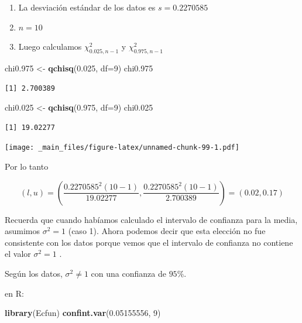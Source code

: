 \documentclass[
]{book}
\newenvironment{Shaded}{\begin{snugshade}}{\end{snugshade}}
\newcommand{\AttributeTok}[1]{\textcolor[rgb]{0.13,0.29,0.53}{#1}}
\newcommand{\DecValTok}[1]{\textcolor[rgb]{0.00,0.00,0.81}{#1}}
\newcommand{\FloatTok}[1]{\textcolor[rgb]{0.00,0.00,0.81}{#1}}
\newcommand{\FunctionTok}[1]{\textcolor[rgb]{0.13,0.29,0.53}{\textbf{#1}}}
\newcommand{\NormalTok}[1]{#1}
\newcommand{\OtherTok}[1]{\textcolor[rgb]{0.56,0.35,0.01}{#1}}
\begin{document}
\begin{enumerate}
\def\labelenumi{\arabic{enumi}.}
\item
  La desviación estándar de los datos es \(s=0.2270585\)
\item
  \(n=10\)
\item
  Luego calculamos \(\chi^2_{0.025,n-1}\) y \(\chi^2_{0.975,n-1}\)
\end{enumerate}

\begin{Shaded}
\begin{Highlighting}[]
\NormalTok{chi0}\FloatTok{.975} \OtherTok{\textless{}{-}} \FunctionTok{qchisq}\NormalTok{(}\FloatTok{0.025}\NormalTok{, }\AttributeTok{df=}\DecValTok{9}\NormalTok{)}
\NormalTok{chi0}\FloatTok{.975}
\end{Highlighting}
\end{Shaded}

\begin{verbatim}
[1] 2.700389
\end{verbatim}

\begin{Shaded}
\begin{Highlighting}[]
\NormalTok{chi0}\FloatTok{.025} \OtherTok{\textless{}{-}} \FunctionTok{qchisq}\NormalTok{(}\FloatTok{0.975}\NormalTok{, }\AttributeTok{df=}\DecValTok{9}\NormalTok{)}
\NormalTok{chi0}\FloatTok{.025}
\end{Highlighting}
\end{Shaded}

\begin{verbatim}
[1] 19.02277
\end{verbatim}

\texttt{[image: \_main\_files/figure-latex/unnamed-chunk-99-1.pdf]}

Por lo tanto

\[(l,u)= (\frac{0.2270585^2 (10-1)}{19.02277},\frac{0.2270585^2(10-1)}{2.700389})=(0.02,0.17)\]

Recuerda que cuando habíamos calculado el intervalo de confianza para la media, asumimos \(\sigma^2=1\) (caso 1). Ahora podemos decir que esta elección no fue consistente con los datos porque vemos que el intervalo de confianza no contiene el valor \(\sigma^2=1\) .

Según los datos, \(\sigma^2 \neq 1\) con una confianza de \(95\%\).

en R:

\begin{Shaded}
\begin{Highlighting}[]
\FunctionTok{library}\NormalTok{(Ecfun)}
\FunctionTok{confint.var}\NormalTok{(}\FloatTok{0.05155556}\NormalTok{, }\DecValTok{9}\NormalTok{)}
\end{Highlighting}
\end{Shaded}
\end{document}
